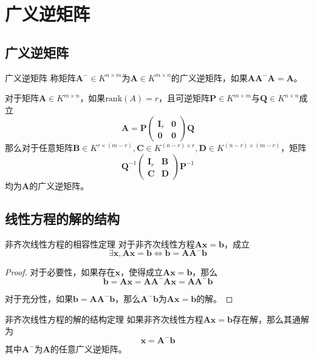 \documentclass[lang = cn, scheme = chinese, thmcnt = section]{elegantbook}
\newcommand{\bs}{\boldsymbol}          %
\newcommand{\rank}{\text{rank}}        %
\begin{document}
\section{广义逆矩阵}

\subsection{广义逆矩阵}

\begin{definition}{广义逆矩阵}
	称矩阵$\bs{A}^-\in K^{n\times m}$为$\bs{A}\in K^{m\times n}$的广义逆矩阵，如果$\bs{AA}^-\bs{A}=\bs{A}$。
\end{definition}

\begin{theorem}
	对于矩阵$\bs{A}\in K^{m\times n}$，如果$\rank(A)=r$，且可逆矩阵$\bs{P}\in K^{m\times m}$与$\bs{Q}\in K^{n\times n}$成立
	$$
	\bs{A}=\bs{P}\begin{pmatrix}
		\bs{I}_r & \bs{0}\\
		\bs{0} & \bs{0}
	\end{pmatrix}\bs{Q}
	$$
	那么对于任意矩阵$\bs{B}\in K^{r\times (m-r)},\bs{C}\in K^{(n-r)\times r},\bs{D}\in K^{(n-r)\times (m-r)}$，矩阵
	$$
	\bs{Q}^{-1}\begin{pmatrix}
		\bs{I}_r & \bs{B}\\
		\bs{C} & \bs{D}
	\end{pmatrix}\bs{P}^{-1}
	$$
	均为$\bs{A}$的广义逆矩阵。
\end{theorem}

\subsection{线性方程的解的结构}

\begin{theorem}{非齐次线性方程的相容性定理}
	对于非齐次线性方程$\bs{Ax}=\bs{b}$，成立
	$$
	\exists\bs{x},\bs{Ax}=\bs{b}\iff
	\bs{b}=\bs{AA}^-\bs{b}
	$$
\end{theorem}

\begin{proof}
	对于必要性，如果存在$\bs{x}$，使得成立$\bs{Ax}=\bs{b}$，那么
	$$
	\bs{b}=\bs{Ax}=\bs{AA}^-\bs{Ax}=\bs{AA}^-\bs{b}
	$$
	
	对于充分性，如果$\bs{b}=\bs{AA}^-\bs{b}$，那么$\bs{A}^-\bs{b}$为$\bs{Ax}=\bs{b}$的解。
\end{proof}

\begin{theorem}{非齐次线性方程的解的结构定理}
	如果非齐次线性方程$\bs{Ax}=\bs{b}$存在解，那么其通解为
	$$
	\bs{x}=\bs{A}^-\bs{b}
	$$
	其中$\bs{A}^-$为$\bs{A}$的任意广义逆矩阵。
\end{theorem}
\end{document}

